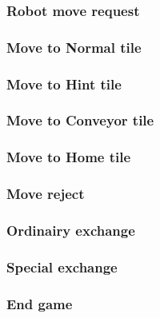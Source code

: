 	\subsubsection{Robot move request}
	

	\subsubsection{Move to Normal tile}
	

	\subsubsection{Move to Hint tile}
	

	\subsubsection{Move to Conveyor tile}
	

	\subsubsection{Move to Home tile}
	


	\subsubsection{Move reject}
	


	\subsubsection{Ordinairy exchange}
	
	
	\subsubsection{Special exchange}
	
	
	\subsubsection{End game}
	
